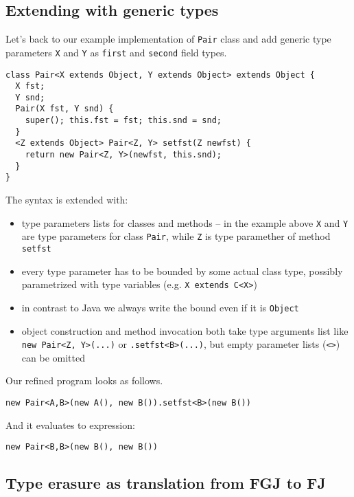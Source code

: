 \documentclass{article}[12pt]
\begin{document}
\subsection{Extending with generic types}

Let's back to our example implementation of \texttt{Pair} class and
add generic type parameters \texttt{X} and \texttt{Y} as
\texttt{first} and \texttt{second} field types.

\begin{verbatim}
class Pair<X extends Object, Y extends Object> extends Object {
  X fst;
  Y snd;
  Pair(X fst, Y snd) {
    super(); this.fst = fst; this.snd = snd;
  }
  <Z extends Object> Pair<Z, Y> setfst(Z newfst) {
    return new Pair<Z, Y>(newfst, this.snd);
  }
}
\end{verbatim}
The syntax is extended with:

\begin{itemize}
\item type parameters lists for classes and methods -- in the example
  above \texttt{X} and \texttt{Y} are type parameters for class
  \texttt{Pair}, while \texttt{Z} is type paramether of method
  \texttt{setfst}
\item every type parameter has to be bounded by some actual class
  type, possibly parametrized with type variables (e.g.
  \texttt{X extends C<X>})
\item in contrast to Java we always write the bound even if it
  is \texttt{Object}
\item object construction and method invocation both take
  type arguments list like \texttt{new Pair<Z, Y>(...)} or
  \texttt{.setfst<B>(...)}, but empty parameter lists (\texttt{<>})
  can be omitted
\end{itemize}
Our refined program looks as follows.

\begin{verbatim}
new Pair<A,B>(new A(), new B()).setfst<B>(new B())
\end{verbatim}
And it evaluates to expression:
\begin{verbatim}
new Pair<B,B>(new B(), new B())
\end{verbatim}

\subsection{Type erasure as translation from FGJ to FJ}
\end{document}
